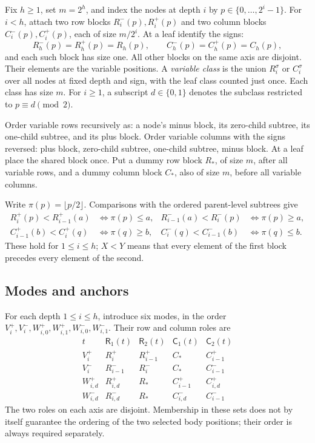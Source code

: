 \documentclass[11pt]{article}
\theoremstyle{definition}
\newcommand{\Rset}{\mathsf R}
\newcommand{\Cset}{\mathsf C}
\begin{document}
Fix \(h\ge1\), set \(m=2^h\), and index the nodes at depth \(i\) by
\(p\in\{0,\ldots,2^i-1\}\). For \(i<h\), attach two row blocks
\(R_i^-(p),R_i^+(p)\) and two column blocks
\(C_i^-(p),C_i^+(p)\), each of size \(m/2^i\). At a leaf identify
the signs:
\[
 R_h^-(p)=R_h^+(p)=R_h(p),\qquad
 C_h^-(p)=C_h^+(p)=C_h(p),
\]
and each such block has size one. All other blocks on the same axis are
disjoint. Their elements are the variable positions. A \emph{variable
class} is the union \(R_i^\sigma\) or \(C_i^\sigma\) over all nodes
at fixed depth and sign, with the leaf class counted just once. Each
class has size \(m\). For \(i\ge1\), a subscript \(d\in\{0,1\}\)
denotes the subclass restricted to \(p\equiv d\pmod2\).

Order variable rows recursively as: a node's minus block, its zero-child
subtree, its one-child subtree, and its plus block. Order variable columns
with the signs reversed: plus block, zero-child subtree, one-child subtree,
minus block. At a leaf place the shared block once. Put a dummy row block
\(R_*\), of size \(m\), after all variable rows, and a dummy column block
\(C_*\), also of size \(m\), before all variable columns.

Write \(\pi(p)=\lfloor p/2\rfloor\). Comparisons with the ordered
parent-level subtrees give
\begin{equation}
\begin{aligned}
 R_i^+(p)<R_{i-1}^+(a)&\iff\pi(p)\le a,&
 R_{i-1}^-(a)<R_i^-(p)&\iff\pi(p)\ge a,\\
 C_{i-1}^+(b)<C_i^+(q)&\iff\pi(q)\ge b,&
 C_i^-(q)<C_{i-1}^-(b)&\iff\pi(q)\le b.
\end{aligned}
\label{eq:orders}
\end{equation}
These hold for \(1\le i\le h\); \(X<Y\) means that every element of
the first block precedes every element of the second.

\subsection{Modes and anchors}

For each depth \(1\le i\le h\), introduce six modes, in the order
\(V_i^+,V_i^-,W_{i,0}^+,W_{i,1}^+,W_{i,0}^-,W_{i,1}^-\).
Their row and column roles are
\begin{equation}
\begin{array}{c|cc|cc}
 t&\Rset_1(t)&\Rset_2(t)&\Cset_1(t)&\Cset_2(t)\\ \hline
 V_i^+&R_i^+&R_{i-1}^+&C_*&C_{i-1}^+\\
 V_i^-&R_{i-1}^-&R_i^-&C_*&C_{i-1}^-\\
 W_{i,d}^+&R_{i,d}^+&R_*&C_{i-1}^+&C_{i,d}^+\\
 W_{i,d}^-&R_{i,d}^-&R_*&C_{i,d}^-&C_{i-1}^-
\end{array}
\label{eq:roles}
\end{equation}
The two roles on each axis are disjoint. Membership in these sets does
not by itself guarantee the ordering of the two selected body positions;
their order is always required separately.
\end{document}
